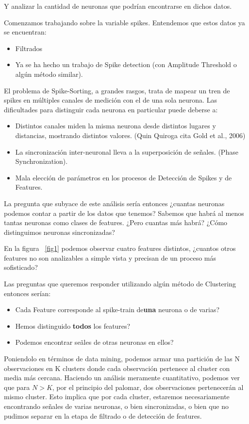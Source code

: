 \documentclass[a4paper,spanish]{article}
\begin{document}
Y analizar la cantidad de neuronas que podr\'ian encontrarse en dichos datos.

Comenzamos trabajando sobre la variable spikes. Entendemos que estos datos ya se encuentran:
\begin{itemize}
	\item Filtrados
	\item Ya se ha hecho un trabajo de Spike detection (con Amplitude Threshold o alg\'un m\'etodo similar).  
\end{itemize}


El problema de Spike-Sorting, a grandes rasgos, trata de mapear un tren de spikes en m\'ultiples canales de medici\'on con el de una sola neurona. Las dificultades para distinguir cada neurona en particular puede deberse a:
\begin{itemize}
	\item Distintos canales miden la misma neurona desde distintos lugares y distancias, mostrando distintos valores. (Quin Quiroga cita Gold et al., 2006)
	\item La sincronizaci\'on inter-neuronal lleva a la superposici\'on de se\~nales. (Phase Synchronization).
	\item Mala elecci\'on de par\'ametros en los procesos de Detecci\'on de Spikes y de Features.
\end{itemize}

La pregunta que subyace de este an\'alisis ser\'ia entonces ¿cuantas neuronas podemos contar a partir de los datos que tenemos?
Sabemos que habr\'a al menos tantas neuronas como clases de features. ¿Pero cuantas m\'as habr\'a? ¿C\'omo distinguimos neuronas sincronizadas?

En la figura ~\ref{fig1} podemos observar cuatro features distintos, ¿cuantos otros features no son analizables a simple vista y precisan de un proceso m\'as sofisticado? 

Las preguntas que queremos responder utilizando alg\'un m\'etodo de Clustering entonces ser\'ian:
\begin{itemize}
	\item Cada Feature corresponde al spike-train de\textbf{una} neurona o de varias? 
	\item Hemos distinguido \textbf{todos} los features? 
	\item Podemos encontrar se\~ales de otras neuronas en ellos?
\end{itemize}

Poniendolo en t\'erminos de data mining, podemos armar una partici\'on de las N observaciones en K clusters donde cada observaci\'on pertenece al cluster con media m\'as cercana.
Haciendo un an\'alisis meramente cuantitativo, podemos ver que para $N > K$, por el principio del palomar, dos observaciones pertenecer\'an al mismo cluster. Esto implica que por cada cluster, estaremos necesariamente encontrando se\~nales de varias neuronas, o bien sincronizadas, o bien que no pudimos separar en la etapa de filtrado o de detecci\'on de features.
\end{document}
